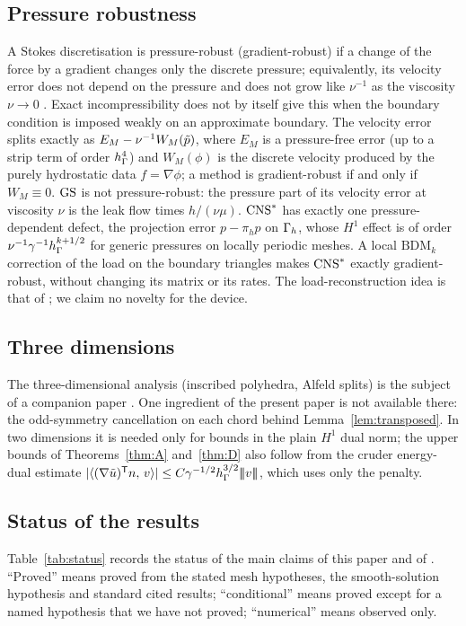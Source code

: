 \subsection{Pressure robustness}
A Stokes discretisation is pressure-robust (gradient-robust) if a change of the force by a gradient changes only the discrete pressure; equivalently, its velocity error does not depend on the pressure and does not grow like $\nu^{-1}$ as the viscosity $\nu\to0$ \cite{JohnEtAl2017}. Exact incompressibility does not by itself give this when the boundary condition is imposed weakly on an approximate boundary. The velocity error splits exactly as $E_M-\nu^{-1}W_M(\tilde p)$, where $E_M$ is a pressure-free error (up to a strip term of order $h_\Gamma^4$) and $W_M(\phi)$ is the discrete velocity produced by the purely hydrostatic data $f=\nabla\phi$; a method is gradient-robust if and only if $W_M\equiv0$. $\mathrm{GS}$ is not pressure-robust: the pressure part of its velocity error at viscosity $\nu$ is the leak flow times $h/(\nu\mu)$. $\mathrm{CNS}^\ast$ has exactly one pressure-dependent defect, the projection error $p-\pi_hp$ on $\Gamma_h$, whose $H^1$ effect is of order $\nu^{-1}\gamma^{-1}h_\Gamma^{k+1/2}$ for generic pressures on locally periodic meshes. A local $\mathrm{BDM}_k$ correction of the load on the boundary triangles makes $\mathrm{CNS}^\ast$ exactly gradient-robust, without changing its matrix or its rates. The load-reconstruction idea is that of \cite{JohnEtAl2017,NeilanOtus2021,ChenLiu2026}; we claim no novelty for the device.

\subsection{Three dimensions}
The three-dimensional analysis (inscribed polyhedra, Alfeld splits) is the subject of a companion paper \cite{PadhiThreeD}. One ingredient of the present paper is not available there: the odd-symmetry cancellation on each chord behind Lemma~\ref{lem:transposed}. In two dimensions it is needed only for bounds in the plain $H^1$ dual norm; the upper bounds of Theorems~\ref{thm:A} and~\ref{thm:D} also follow from the cruder energy-dual estimate $|\langle (\nabla\tilde u)^{\mathsf T}n,\, v\rangle|\le C\gamma^{-1/2}h_\Gamma^{3/2}|\!|\!|v|\!|\!|$, which uses only the penalty.

\subsection{Status of the results}
Table~\ref{tab:status} records the status of the main claims of this paper and of \cite{PadhiExt}. ``Proved'' means proved from the stated mesh hypotheses, the smooth-solution hypothesis and standard cited results; ``conditional'' means proved except for a named hypothesis that we have not proved; ``numerical'' means observed only.

